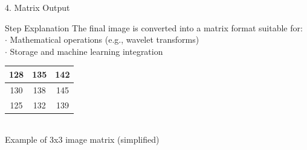 \documentclass{beamer}
\begin{document}
\begin{frame}{4. Matrix Output}
    \begin{block}{Step Explanation}
        The final image is converted into a matrix format suitable for: \\
        $\boldsymbol{\cdot}$ Mathematical operations (e.g., wavelet transforms) \\
        $\boldsymbol{\cdot}$ Storage and machine learning integration
    \end{block}

    \vspace{1cm}
    \centering
    \begin{tabular}{|c|c|c|}
        \hline
        128 & 135 & 142 \\
        \hline
        130 & 138 & 145 \\
        \hline
        125 & 132 & 139 \\
        \hline
    \end{tabular} \\
    \vspace{0.5cm}
    \small{Example of 3x3 image matrix (simplified)}
\end{frame}
\end{document}
